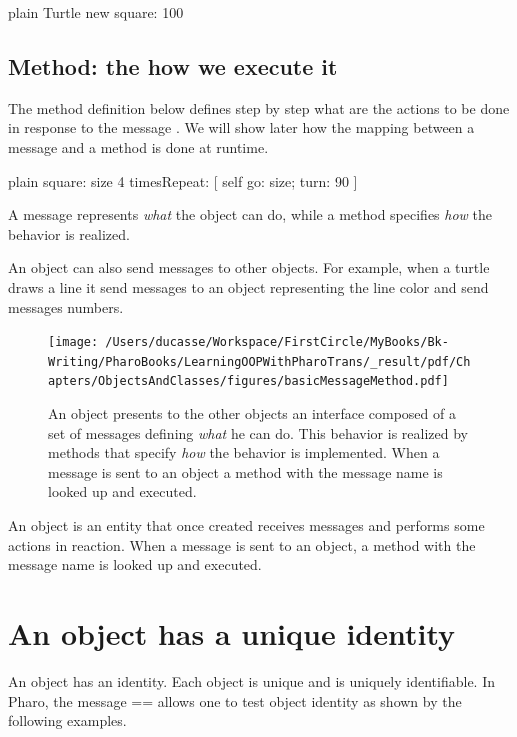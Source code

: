 \documentclass[10pt,twoside,english]{_support/latex/sbabook/sbabook}
\begin{document}
\begin{displaycode}{plain}
Turtle new square: 100
\end{displaycode}
\subsection{Method: the how we execute it}
The method definition  below defines step by step what are the actions to be done in response to the message . We will show later how the mapping between a message and a method is done at runtime. 

\begin{displaycode}{plain}
square: size
	4 timesRepeat: [ self go: size; turn: 90 ]
\end{displaycode}

\begin{important}
A message represents \textit{what} the object can do, while a method specifies \textit{how} the behavior is realized. 
\end{important}

An object can also send messages to other objects. For example, when a turtle draws a line it send messages to an object representing the line  color and send messages numbers.


\begin{figure}

\begin{center}
\texttt{[image: /Users/ducasse/Workspace/FirstCircle/MyBooks/Bk-Writing/PharoBooks/LearningOOPWithPharoTrans/\_result/pdf/Chapters/ObjectsAndClasses/figures/basicMessageMethod.pdf]}\caption{An object presents to the other objects an interface composed of a set of messages defining \textit{what} he can do. This behavior is realized by methods that specify \textit{how} the behavior is implemented. When a message is sent to an object a method with the message name is looked up and executed. \label{basicMessageMethod}}\end{center}
\end{figure}


\begin{important}
An object is an entity that once created receives messages and performs some actions in reaction. When a message is sent to an object, a method with the message name is looked up and executed.
\end{important}
\section{An object has  a unique identity}
An object has an identity. Each object is unique and is uniquely identifiable. In Pharo, the message == allows one to test object identity as shown by the following examples.
\end{document}
